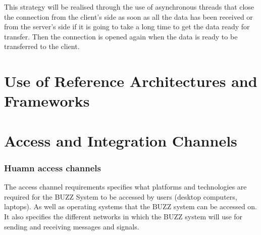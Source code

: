 \documentclass[a4paper]{article}
\begin{document}
This strategy will be realised through the use of asynchronous threads that close the connection from the client’s side as soon as all the data has been received or from the server’s side if it is going to take a long time to get the data ready for transfer. Then the connection is opened again when the data is ready to be transferred to the client. 


\section{Use of Reference Architectures and Frameworks}

\section{Access and Integration Channels}
\subsubsection{Huamn access channels }
The access channel requirements specifies what platforms and technologies are required for the BUZZ System to be accessed by users (desktop computers, laptops). As well as operating systems that the BUZZ system can be accessed on. It also specifies the different networks in which the BUZZ system will use for sending and receiving messages and signals.
\end{document}
